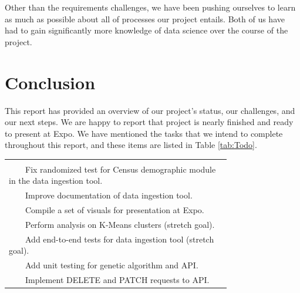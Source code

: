 \documentclass[onecolumn, draftclsnofoot,10pt, compsoc]{IEEEtran}
\newcommand{\tabitem}{~~\llap{\textbullet}~~}
\begin{document}
\begin{singlespace}
Other than the requirements challenges, we have been pushing ourselves to learn as much as possible about all of processes our project entails. Both of us have had to gain significantly more knowledge of data science over the course of the project.  

\section{Conclusion} \label{conclusion}
This report has provided an overview of our project's status, our challenges, and our next steps. We are happy to report that project is nearly finished and ready to present at Expo. We have mentioned the tasks that we intend to complete throughout this report, and these items are listed in Table \ref{tab:Todo}.


\begin{center}
 \label{tab:Todo}
\begin{singlespace}
\begin{tabular}{ |p{0.75\linewidth}| }
    \hline
     \\
     \tabitem Fix randomized test for Census demographic module in the data ingestion tool.
     \\
     \tabitem Improve documentation of data ingestion tool.
     \\
     \tabitem Compile a set of visuals for presentation at Expo.
     \\
     \tabitem Perform analysis on K-Means clusters (stretch goal).
     \\
	 \tabitem Add end-to-end tests for data ingestion tool (stretch goal).
     \\
     \tabitem Add unit testing for genetic algorithm and API.
     \\
     \tabitem Implement DELETE and PATCH requests to API.
     \\
     \hline
\end{tabular}
\end{singlespace}
\end{center}


\end{singlespace}
%
\end{document}
